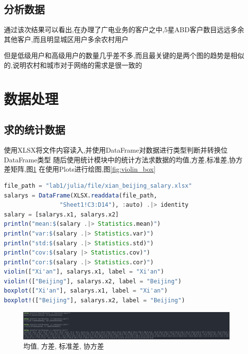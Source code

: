 \documentclass[a4paper]{article}
\begin{document}
\subsection{分析数据}\label{sub:ptxeva}

通过该次结果可以看出,在办理了广电业务的客户之中,5星ABD客户数目远远多余其他客户,而且明显城区用户多余农村用户

但是低级用户和高级用户的数量几乎差不多,而且最关键的是两个图的趋势是相似的,说明农村和城市对于网络的需求是很一致的

\newpage

\section{数据处理}\label{sub:process}
\subsection{求的统计数据} \label{sub:process-lab}

使用XLSX将文件内容读入,并使用DataFrame对数据进行类型判断并转换位DataFrame类型
随后使用统计模块中的统计方法求数据的均值,方差,标准差,协方差矩阵,图\ref{fig:mean}
在使用Plots进行绘图,图\ref{fig:violin_box}
\begin{lstlisting}[language=julia]
file_path = "lab1/julia/file/xian_beijing_salary.xlsx"
salarys = DataFrame(XLSX.readdata(file_path, 
                "Sheet1!C3:D14"), :auto) .|> identity
salary = [salarys.x1, salarys.x2]
println("mean:$(salary .|> Statistics.mean)")
println("var:$(salary .|> Statistics.var)")
println("std:$(salary .|> Statistics.std)")
println("cov:$(salary |> Statistics.cov)")
println("cor:$(salary .|> Statistics.cor)")
violin(["Xi'an"], salarys.x1, label = "Xi'an")
violin!(["Beijing"], salarys.x2, label = "Beijing")
boxplot(["Xi'an"], salarys.x1, label = "Xi'an")
boxplot!(["Beijing"], salarys.x2, label = "Beijing")
\end{lstlisting}

\begin{figure}[h]
    \centering
    \includegraphics[width=12cm]{images/数据处理.png}
    \caption{均值, 方差, 标准差, 协方差}
    \label{fig:mean}
\end{figure}
\end{document}
